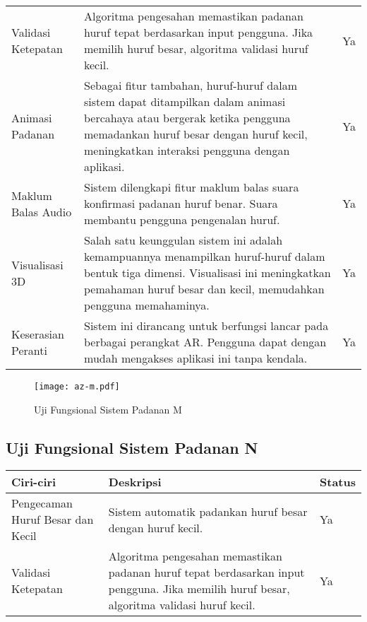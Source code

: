 \begin{itemize}
\begin{itemize}
\begin{itemize}
\begin{itemize}
\begin{itemize}
\begin{itemize}
\begin{itemize}
\begin{itemize}
\begin{flushleft}
\begin{tabular}{>{\raggedright}p{3cm}p{9cm}>{\centering\arraybackslash}p{2cm}}
Validasi Ketepatan & Algoritma pengesahan memastikan padanan huruf tepat berdasarkan input pengguna. Jika memilih huruf besar, algoritma validasi huruf kecil. & Ya \\

Animasi Padanan & Sebagai fitur tambahan, huruf-huruf dalam sistem dapat ditampilkan dalam animasi bercahaya atau bergerak ketika pengguna memadankan huruf besar dengan huruf kecil, meningkatkan interaksi pengguna dengan aplikasi. & Ya \\

Maklum Balas Audio & Sistem dilengkapi fitur maklum balas suara konfirmasi padanan huruf benar. Suara membantu pengguna pengenalan huruf. & Ya \\

Visualisasi 3D & Salah satu keunggulan sistem ini adalah kemampuannya menampilkan huruf-huruf dalam bentuk tiga dimensi. Visualisasi ini meningkatkan pemahaman huruf besar dan kecil, memudahkan pengguna memahaminya. & Ya \\

Keserasian Peranti & Sistem ini dirancang untuk berfungsi lancar pada berbagai perangkat AR. Pengguna dapat dengan mudah mengakses aplikasi ini tanpa kendala. & Ya \\
\bottomrule
\end{tabular}

\begin{figure}
    \centering
    \texttt{[image: az-m.pdf]}
    \caption{Uji Fungsional  Sistem Padanan M }
    \label{fig:az-m.pdf}
\end{figure}

\subsection{Uji Fungsional  Sistem Padanan N}

\begin{tabular}{>{\raggedright}p{3cm}p{9cm}>{\raggedright\arraybackslash}p{2cm}}
\toprule
\textbf{Ciri-ciri} & \textbf{Deskripsi} & \textbf{Status} \\
\midrule
Pengecaman Huruf Besar dan Kecil & Sistem automatik padankan huruf besar dengan huruf kecil. & Ya \\

Validasi Ketepatan & Algoritma pengesahan memastikan padanan huruf tepat berdasarkan input pengguna. Jika memilih huruf besar, algoritma validasi huruf kecil. & Ya \\


\end{tabular}
\end{flushleft}
\end{itemize}
\end{itemize}
\end{itemize}
\end{itemize}
\end{itemize}
\end{itemize}
\end{itemize}
\end{itemize}
